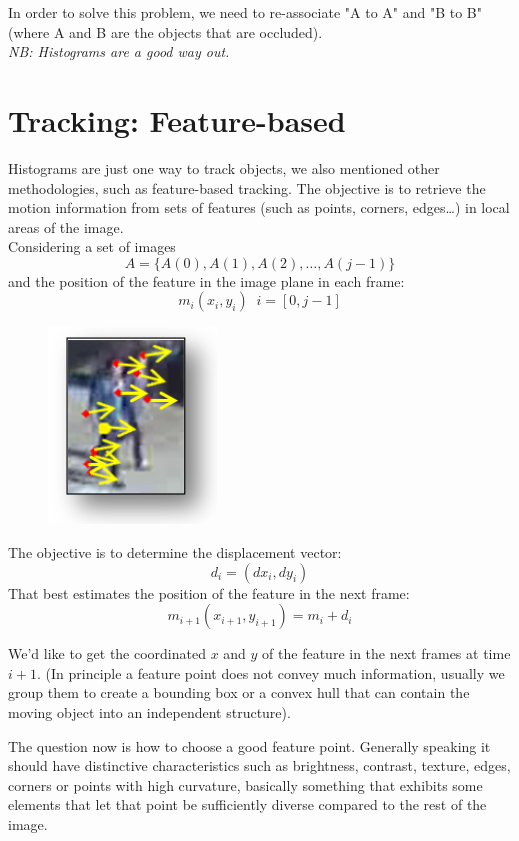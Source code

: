 In order to solve this problem, we need to re-associate "A to A" and "B to B" (where A and B are the objects that are occluded). 
\\\textit{NB: Histograms are a good way out.}

\section{Tracking: Feature-based}

Histograms are just one way to track objects, we also mentioned other methodologies, such as feature-based tracking. The objective is to retrieve the motion information from sets of features (such as points, corners, edges\dots) in local areas of the image.
\\Considering a set of images
\[
    A = \{A(0), A(1), A(2), \dots, A(j-1)\}
\] 
and the position of the feature in the image plane in each frame:
\[
    m_i(x_i, y_i)\;\;i = [0, j-1] 
\] 
\begin{figure}
    \includegraphics[scale=0.3]{Figures/Tracking.png}
\end{figure}
The objective is to determine the displacement vector:
\[
    d_i = (dx_i, dy_i)
\] 
That best estimates the position of the feature in the next frame:
\[
    m_{i+1}(x_{i+1}, y_{i+1}) = m_i + d_i
\]

We'd like to get the coordinated \(x\) and \(y\) of the feature in the next frames at time \(i+1\).
(In principle a feature point does not convey much information, usually we group them to create a bounding box or a convex hull that can contain the moving object into an independent structure).

The question now is how to choose a good feature point. Generally speaking it should have distinctive characteristics such as brightness, contrast, texture, edges, corners or points with high curvature, basically something that exhibits some elements that let that point be sufficiently diverse compared to the rest of the image.

